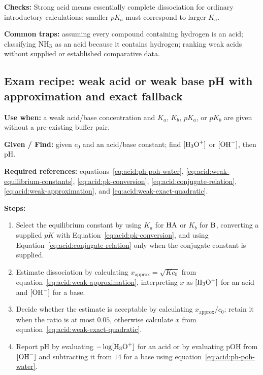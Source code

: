 \textbf{Checks:} Strong acid means essentially complete dissociation for ordinary introductory calculations; smaller \(pK_a\) must correspond to larger \(K_a\).

\textbf{Common traps:} assuming every compound containing hydrogen is an acid; classifying \(\ce{NH3}\) as an acid because it contains hydrogen; ranking weak acids without supplied or established comparative data.

\subsection{Exam recipe: weak acid or weak base pH with approximation and exact fallback}
\textbf{Use when:} a weak acid/base concentration and \(K_a\), \(K_b\), \(pK_a\), or \(pK_b\) are given without a pre-existing buffer pair.

\textbf{Given / Find:} given \(c_0\) and an acid/base constant; find \([\ce{H3O+}]\) or \([\ce{OH-}]\), then pH.

\textbf{Required references:} equations~\eqref{eq:acid:ph-poh-water}, \eqref{eq:acid:weak-equilibrium-constants}, \eqref{eq:acid:pk-conversion}, \eqref{eq:acid:conjugate-relation}, \eqref{eq:acid:weak-approximation}, and \eqref{eq:acid:weak-exact-quadratic}.


\textbf{Steps:}
\begin{enumerate}
    \item Select the equilibrium constant by using \(K_a\) for \(\ce{HA}\) or \(K_b\) for \(\ce{B}\), converting a supplied \(pK\) with Equation~\eqref{eq:acid:pk-conversion}, and using Equation~\eqref{eq:acid:conjugate-relation} only when the conjugate constant is supplied.
    \item Estimate dissociation by calculating \(x_{\mathrm{approx}}=\sqrt{Kc_0}\) from equation~\eqref{eq:acid:weak-approximation}, interpreting \(x\) as \([\ce{H3O+}]\) for an acid and \([\ce{OH-}]\) for a base.
    \item Decide whether the estimate is acceptable by calculating \(x_{\mathrm{approx}}/c_0\); retain it when the ratio is at most \(0.05\), otherwise calculate \(x\) from equation~\eqref{eq:acid:weak-exact-quadratic}.
    \item Report pH by evaluating \(-\log[\ce{H3O+}]\) for an acid or by evaluating pOH from \([\ce{OH-}]\) and subtracting it from \(14\) for a base using equation~\eqref{eq:acid:ph-poh-water}.
\end{enumerate}


